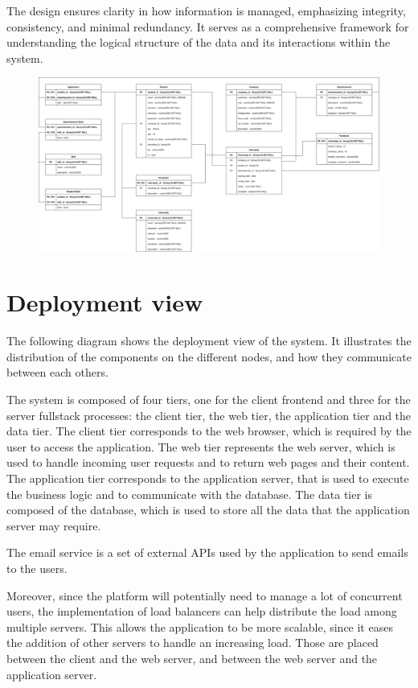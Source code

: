 The design ensures clarity in how information is managed, emphasizing integrity, consistency, and minimal redundancy.
It serves as a comprehensive framework for understanding the logical structure of the data and its interactions within the system.

\begin{figure}[H]
    \centering
    \includegraphics[width=0.8\linewidth]{../assets/er-diagrams/er-diagram.png}
\end{figure}

\section{Deployment view}

The following diagram shows the deployment view of the system.
It illustrates the distribution of the components on the different nodes, and how they communicate between each others.

The system is composed of four tiers, one for the client frontend and three for the server fullstack processes: the client tier, the web tier, the application tier and the data tier.
The client tier corresponds to the web browser, which is required by the user to access the application.
The web tier represents the web server, which is used to handle incoming user requests and to return web pages and their content.
The application tier corresponds to the application server, that is used to execute the business logic and to communicate with the database.
The data tier is composed of the database, which is used to store all the data that the application server may require.

The email service is a set of external APIs used by the application to send emails to the users.

Moreover, since the platform will potentially need to manage a lot of concurrent users, the implementation of load balancers can help distribute the load among multiple servers.
This allows the application to be more scalable, since it eases the addition of other servers to handle an increasing load.
Those are placed between the client and the web server, and between the web server and the application server.

